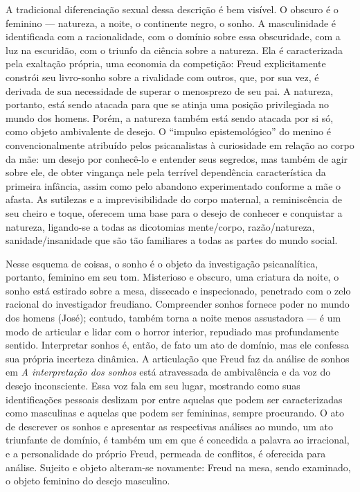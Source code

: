 A tradicional diferenciação sexual dessa descrição é bem visível. O
obscuro é o feminino --- natureza, a noite, o continente negro, o sonho.
A masculinidade é identificada com a racionalidade, com o domínio sobre
essa obscuridade, com a luz na escuridão, com o triunfo da ciência sobre
a natureza. Ela é caracterizada pela exaltação própria, uma economia da
competição: Freud explicitamente constrói seu livro-sonho sobre a
rivalidade com outros, que, por sua vez, é derivada de sua necessidade
de superar o menosprezo de seu pai. A natureza, portanto, está sendo
atacada para que se atinja uma posição privilegiada no mundo dos homens.
Porém, a natureza também está sendo atacada por si só, como objeto
ambivalente de desejo. O ``impulso epistemológico'' do menino é
convencionalmente atribuído pelos psicanalistas à curiosidade em relação
ao corpo da mãe: um desejo por conhecê-lo e entender seus segredos, mas
também de agir sobre ele, de obter vingança nele pela terrível
dependência característica da primeira infância, assim como pelo
abandono experimentado conforme a mãe o afasta. As sutilezas e a
imprevisibilidade do corpo maternal, a reminiscência de seu cheiro e
toque, oferecem uma base para o desejo de conhecer e conquistar a
natureza, ligando-se a todas as dicotomias mente/corpo, razão/natureza,
sanidade/insanidade que são tão familiares a todas as partes do mundo
social.

Nesse esquema de coisas, o sonho é o objeto da investigação
psicanalítica, portanto, feminino em seu tom. Misterioso e obscuro, uma
criatura da noite, o sonho está estirado sobre a mesa, dissecado e
inspecionado, penetrado com o zelo racional do investigador freudiano.
Compreender sonhos fornece poder no mundo dos homens (José); contudo,
também torna a noite menos assustadora --- é um modo de articular e lidar
com o horror interior, repudiado mas profundamente sentido. Interpretar
sonhos é, então, de fato um ato de domínio, mas ele confessa sua própria
incerteza dinâmica. A articulação que Freud faz da análise de sonhos em
\emph{A interpretação dos sonhos} está atravessada de ambivalência e da
voz do desejo inconsciente. Essa voz fala em seu lugar, mostrando como
suas identificações pessoais deslizam por entre aquelas que podem ser
caracterizadas como masculinas e aquelas que podem ser femininas, sempre
procurando. O ato de descrever os sonhos e apresentar as respectivas
análises ao mundo, um ato triunfante de domínio, é também um em que é
concedida a palavra ao irracional, e a personalidade do próprio Freud,
permeada de conflitos, é oferecida para análise. Sujeito e objeto
alteram-se novamente: Freud na mesa, sendo examinado, o objeto feminino
do desejo masculino.

